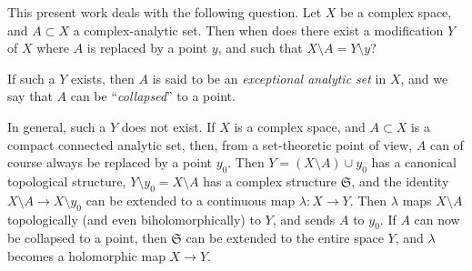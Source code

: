 \documentclass{article}
\theoremstyle{plain}
\newcommand{\fk}{\mathfrak}
\begin{document}
This present work deals with the following question.
Let $X$ be a complex space, and $A\subset X$ a complex-analytic set.
Then when does there exist a modification $Y$ of $X$ where $A$ is replaced by a point $y$, and such that $X\setminus A=Y\setminus y$?

If such a $Y$ exists, then $A$ is said to be an \emph{exceptional analytic set} in $X$, and we say that $A$ can be ``\emph{collapsed}'' to a point.

In general, such a $Y$ does not exist.
If $X$ is a complex space, and $A\subset X$ is a compact connected analytic set, then, from a set-theoretic point of view, $A$ can of course always be replaced by a point $y_0$.
Then $Y=(X\setminus A)\cup y_0$ has a canonical topological structure, $Y\setminus y_0=X\setminus A$ has a complex structure $\fk{S}$, and the identity $X\setminus A\to X\setminus y_0$ can be extended to a continuous map $\lambda\colon X\to Y$.
Then $\lambda$ maps $X\setminus A$ topologically (and even biholomorphically) to $Y$, and sends $A$ to $y_0$.
If $A$ can now be collapsed to a point, then $\fk{S}$ can be extended to the entire space $Y$, and $\lambda$ becomes a holomorphic map $X\to Y$.
\end{document}
